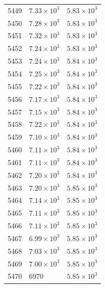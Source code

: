 \begin{table}[H]
\begin{tabular}{lll}
5449 & $\displaystyle 7.33 \times 10^{3}$ & $\displaystyle 5.83 \times 10^{3}$ \\
5450 & $\displaystyle 7.28 \times 10^{3}$ & $\displaystyle 5.83 \times 10^{3}$ \\
5451 & $\displaystyle 7.32 \times 10^{3}$ & $\displaystyle 5.83 \times 10^{3}$ \\
5452 & $\displaystyle 7.24 \times 10^{3}$ & $\displaystyle 5.83 \times 10^{3}$ \\
5453 & $\displaystyle 7.24 \times 10^{3}$ & $\displaystyle 5.84 \times 10^{3}$ \\
5454 & $\displaystyle 7.25 \times 10^{3}$ & $\displaystyle 5.84 \times 10^{3}$ \\
5455 & $\displaystyle 7.22 \times 10^{3}$ & $\displaystyle 5.84 \times 10^{3}$ \\
5456 & $\displaystyle 7.17 \times 10^{3}$ & $\displaystyle 5.84 \times 10^{3}$ \\
5457 & $\displaystyle 7.15 \times 10^{3}$ & $\displaystyle 5.84 \times 10^{3}$ \\
5458 & $\displaystyle 7.22 \times 10^{3}$ & $\displaystyle 5.84 \times 10^{3}$ \\
5459 & $\displaystyle 7.10 \times 10^{3}$ & $\displaystyle 5.84 \times 10^{3}$ \\
5460 & $\displaystyle 7.11 \times 10^{3}$ & $\displaystyle 5.84 \times 10^{3}$ \\
5461 & $\displaystyle 7.11 \times 10^{3}$ & $\displaystyle 5.84 \times 10^{3}$ \\
5462 & $\displaystyle 7.20 \times 10^{3}$ & $\displaystyle 5.84 \times 10^{3}$ \\
5463 & $\displaystyle 7.20 \times 10^{3}$ & $\displaystyle 5.85 \times 10^{3}$ \\
5464 & $\displaystyle 7.14 \times 10^{3}$ & $\displaystyle 5.85 \times 10^{3}$ \\
5465 & $\displaystyle 7.11 \times 10^{3}$ & $\displaystyle 5.85 \times 10^{3}$ \\
5466 & $\displaystyle 7.11 \times 10^{3}$ & $\displaystyle 5.85 \times 10^{3}$ \\
5467 & $\displaystyle 6.99 \times 10^{3}$ & $\displaystyle 5.85 \times 10^{3}$ \\
5468 & $\displaystyle 7.03 \times 10^{3}$ & $\displaystyle 5.85 \times 10^{3}$ \\
5469 & $\displaystyle 7.00 \times 10^{3}$ & $\displaystyle 5.85 \times 10^{3}$ \\
5470 & 6970 & $\displaystyle 5.85 \times 10^{3}$ \\

\end{tabular}
\end{table}
